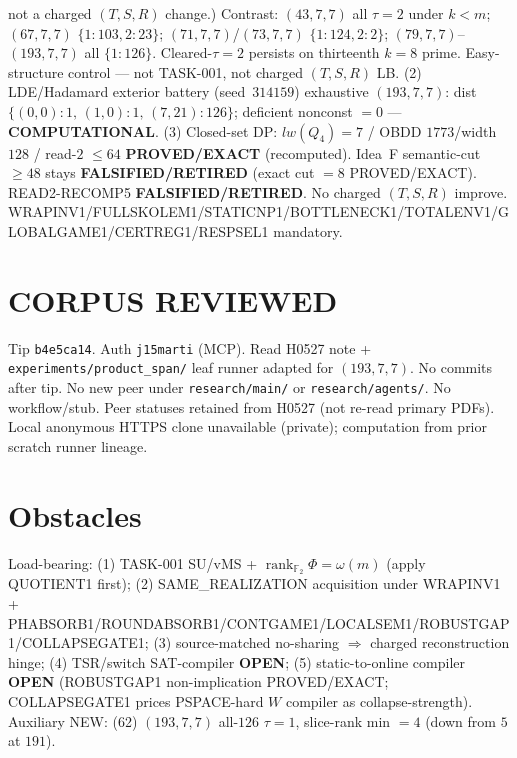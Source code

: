 \documentclass[11pt]{article}
\begin{document}
not a charged $(T,S,R)$ change.)
Contrast: $(43,7,7)$ all $\tau{=}2$ under $k{<}m$; $(67,7,7)$ $\{1{:}103,2{:}23\}$;
$(71,7,7)$/$(73,7,7)$ $\{1{:}124,2{:}2\}$; $(79,7,7)$--$(193,7,7)$ all $\{1{:}126\}$.
Cleared-$\tau{=}2$ persists on thirteenth $k{=}8$ prime. Easy-structure control --- not TASK-001,
not charged $(T,S,R)$ LB.
(2) LDE/Hadamard exterior battery (seed~$314159$) exhaustive $(193,7,7)$:
dist $\{(0,0){:}1,\,(1,0){:}1,\,(7,21){:}126\}$; deficient nonconst $=0$ --- \textbf{COMPUTATIONAL}.
(3) Closed-set DP: $lw(Q_4)=7$ / OBDD $1773$/width $128$ / read-$2$ $\le64$
\textbf{PROVED/EXACT} (recomputed).
Idea~F semantic-cut $\ge48$ stays \textbf{FALSIFIED/RETIRED} (exact cut $=8$ PROVED/EXACT).
READ2-RECOMP5 \textbf{FALSIFIED/RETIRED}. No charged $(T,S,R)$ improve.
WRAPINV1/FULLSKOLEM1/STATICNP1/BOTTLENECK1/TOTALENV1/GLOBALGAME1/CERTREG1/RESPSEL1 mandatory.

\section*{CORPUS REVIEWED}
Tip \texttt{b4e5ca14}. Auth \texttt{j15marti} (MCP). Read H0527 note +
\texttt{experiments/product\_span/} leaf runner adapted for $(193,7,7)$.
No commits after tip. No new peer under \texttt{research/main/} or \texttt{research/agents/}.
No workflow/stub. Peer statuses retained from H0527 (not re-read primary PDFs).
Local anonymous HTTPS clone unavailable (private); computation from prior scratch runner lineage.

\section*{Obstacles}
Load-bearing: (1) TASK-001 SU/vMS + $\operatorname{rank}_{\mathbb F_2}\Phi=\omega(m)$ (apply QUOTIENT1 first);
(2) SAME\_REALIZATION acquisition under WRAPINV1 + PHABSORB1/ROUNDABSORB1/CONTGAME1/LOCALSEM1/ROBUSTGAP1/COLLAPSEGATE1;
(3) source-matched no-sharing $\Rightarrow$ charged reconstruction hinge;
(4) TSR/switch SAT-compiler \textbf{OPEN};
(5) static-to-online compiler \textbf{OPEN} (ROBUSTGAP1 non-implication PROVED/EXACT;
COLLAPSEGATE1 prices PSPACE-hard $W$ compiler as collapse-strength).
Auxiliary NEW: (62) $(193,7,7)$ all-$126$ $\tau{=}1$, slice-rank min $=4$ (down from $5$ at $191$).
\end{document}

